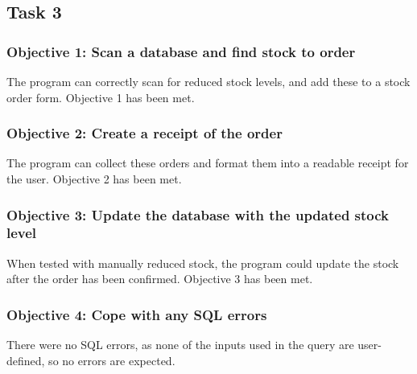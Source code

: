 \documentclass[a4paper]{article}
\begin{document}
\subsection{Task 3}
\subsubsection{Objective 1: Scan a database and find stock to order}
The program can correctly scan for reduced stock levels, and add these to a stock order form. Objective 1 has been met.
\subsubsection{Objective 2: Create a receipt of the order}
The program can collect these orders and format them into a readable receipt for the user. Objective 2 has been met.
\subsubsection{Objective 3: Update the database with the updated stock level}
When tested with manually reduced stock, the program could update the stock after the order has been confirmed. Objective 3 has been met.
\subsubsection{Objective 4: Cope with any SQL errors}
There were no SQL errors, as none of the inputs used in the query are user-defined, so no errors are expected.
\end{document}
